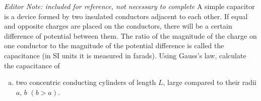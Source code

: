 \documentclass[11pt]{cubouldpset}
\begin{document}
\begin{solution}
\vfill
\end{solution}

\newpage

\begin{problem}[1.6 (c)] 

\textit{Editor Note: included for reference, not necessary to complete}
\newline
A simple capacitor is a device formed by two insulated conductors adjacent to each other. If equal and opposite charges are placed on the conductors, there will be a certain difference of potential between them. The ratio of the magnitude of the charge on one conductor to the magnitude of the potential difference is called the capacitance (in SI units it is measured in farads). Using Gauss's law, calculate the capacitance of

\begin{enumerate}[(c)]
\item two concentric conducting cylinders of length $L$, large compared to their radii $a$, $b$ $(b>a)$.

\end{enumerate}

\end{problem}

\begin{solution}
\vfill
\end{solution}
\end{document}
